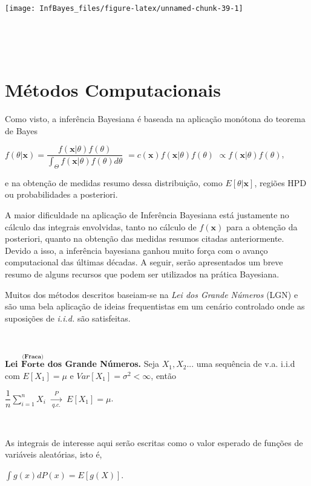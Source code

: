 \documentclass[
]{book}
\begin{document}
\begin{center}\texttt{[image: InfBayes\_files/figure-latex/unnamed-chunk-39-1]} \end{center}

\(~\)

\(~\)

\hypertarget{Comp}{%
\chapter{Métodos Computacionais}\label{Comp}}

Como visto, a inferência Bayesiana é baseada na aplicação monótona do teorema de Bayes

\(f(\theta|\boldsymbol x)=\dfrac{f(\boldsymbol x|\theta)f(\theta)}{\displaystyle\int_\Theta f(\boldsymbol x|\theta)f(\theta)d\theta}\) \(= c(\boldsymbol x) f(\boldsymbol x|\theta)f(\theta)\) \(\propto f(\boldsymbol x|\theta)f(\theta)\),

e na obtenção de medidas resumo dessa distribuição, como \(E[\theta|\boldsymbol x]\), regiões HPD ou probabilidades a posteriori.

A maior dificuldade na aplicação de Inferência Bayesiana está justamente no cálculo das integrais envolvidas, tanto no cálculo de \(f(\boldsymbol x)\) para a obtenção da posteriori, quanto na obtenção das medidas resumos citadas anteriormente. Devido a isso, a inferência bayesiana ganhou muito força com o avanço computacional das últimas décadas. A seguir, serão apresentados um breve resumo de alguns recursos que podem ser utilizados na prática Bayesiana.

Muitos dos métodos descritos baseiam-se na \emph{Lei dos Grande Números} (LGN) e são uma bela aplicação de ideias frequentistas em um cenário controlado onde as suposições de \emph{i.i.d.} são satisfeitas.

\(~\)

\textbf{Lei \(\overset{\textbf{(Fraca)}}{\textbf{Forte}}\) dos Grande Números.} Seja \(X_1,X_2...\) uma sequência de v.a. i.i.d com \(E[X_1]=\mu\) e \(Var[X_1]=\sigma^2<\infty\), então

\(\dfrac{1}{n}\displaystyle \sum_{i=1}^n X_i ~~\underset{q.c.}{\overset{P}{\longrightarrow}}~~ E[X_1]=\mu\).

\(~\)

As integrais de interesse aqui serão escritas como o valor esperado de funções de variáveis aleatórias, isto é,

\(\displaystyle \int g(x) dP(x) = E\left[g(X)\right]\).
\end{document}
